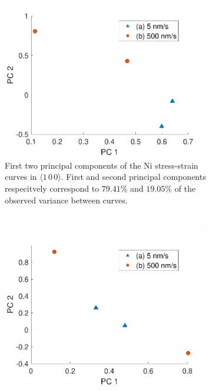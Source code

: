 \begin{figure}
    \centering
    \begin{subfigure}[t]{0.45\linewidth}
        \centering
        \includegraphics[width=\linewidth]{../data/Ni100_pca.pdf}
        \caption[First two principal components of the Ni stress-strain curves in $\langle 1\,0\,0 \rangle$.]{First two principal components of the Ni stress-strain curves in $\langle 1\,0\,0 \rangle$. First and second principal components respecitvely correspond to $79.41\%$ and $19.05\%$ of the observed variance between curves.}
        \label{sf:Ni100_pca}
    \end{subfigure}
    ~
    \begin{subfigure}[t]{0.45\linewidth}
        \centering
        \includegraphics[width=\linewidth]{../data/Ni110_pca.pdf}

\end{subfigure}
\end{figure}
